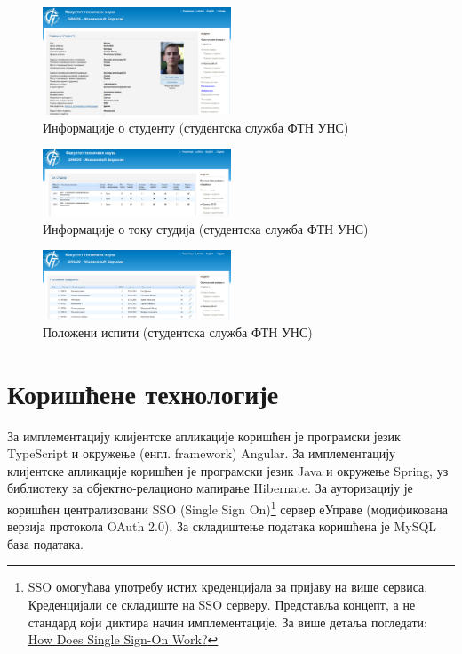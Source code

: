 \documentclass[a4paper]{article}
\begin{document}
\begin{figure}[H]
    \centering
    \includegraphics[width=0.5\textwidth,keepaspectratio]{images/ftn1.png}
    \caption{Информације о студенту (студентска служба ФТН УНС)}
    \label{fig:ftn1}
\end{figure}

\begin{figure}[H]
    \centering
    \includegraphics[width=0.5\textwidth,keepaspectratio]{images/ftn2.png}
    \caption{Информације о току студија (студентска служба ФТН УНС)}
    \label{fig:ftn3}
\end{figure}

\begin{figure}[H]
    \centering
    \includegraphics[width=0.5\textwidth,keepaspectratio]{images/ftn3.png}
    \caption{Положени испити (студентска служба ФТН УНС)}
    \label{fig:ftn3}
\end{figure}

\section*{Коришћене технологије}

За имплементацију клијентске апликације коришћен је програмски језик TypeScript\cite{typescript} и окружење (енгл. framework) Angular\cite{angular}.
За имплементацију клијентске апликације коришћен је програмски језик Java\cite{java} и окружење Spring\cite{spring}, уз библиотеку за објектно-релационо мапирање Hibernate\cite{hibernate}.
За ауторизацију је коришћен централизовани SSO (Single Sign On)\footnote{SSO омогућава употребу истих креденцијала за пријаву на више сервиса. Креденцијали се складиште на SSO серверу. Представља концепт, а не стандард који диктира начин имплементације. За више детаља погледати: \href{https://www.onelogin.com/learn/how-single-sign-on-works}{How Does Single Sign-On Work?}}
сервер еУправе (модификована верзија протокола OAuth 2.0\cite{oauth}).
За складиштење података коришћена је MySQL\cite{mysql} база података.
\end{document}
